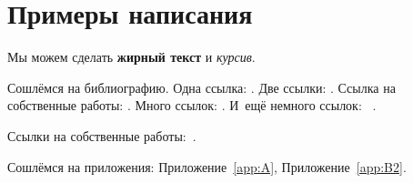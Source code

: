 
\chapter{Примеры написания}\label{ch:ch5}
Мы можем сделать \textbf{жирный текст} и \textit{курсив}.

Сошлёмся на библиографию.
Одна ссылка: \cite[с.~54]{Sokolov}\cite[с.~36]{Gaidaenko}.
Две ссылки: \cite{Sokolov,Gaidaenko}.
Ссылка на собственные работы: \cite{vakbib1, confbib2}.
Много ссылок: %
\cite{Lermontov, Management, Borozda, Marketing, Constitution, FamilyCode,
    Gost.7.0.53, Razumovski, Lagkueva, Pokrovski, Methodology, Berestova,
    Kriger}%
%
.
И~ещё немного ссылок:~\cite{Article,Book,Booklet,Conference,Inbook,Incollection,Manual,Mastersthesis,
    Misc,Phdthesis,Proceedings,Techreport,Unpublished}
\cite{medvedev2006jelektronnye, CEAT:CEAT581, doi:10.1080/01932691.2010.513279,
    Gosele1999161,Li2007StressAnalysis, Shoji199895, test:eisner-sample,
    test:eisner-sample-shorted, AB_patent_Pomerantz_1968, iofis_patent1960}%
%
.

%

Ссылки на собственные работы:~\cite{vakbib1, confbib1}.

Сошлёмся на приложения: Приложение~\cref{app:A}, Приложение~\cref{app:B2}.

